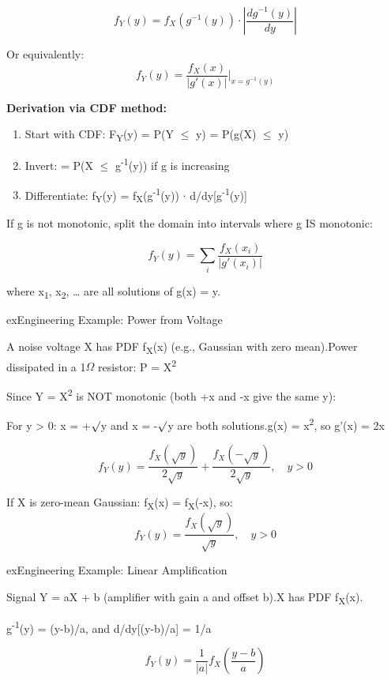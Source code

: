 \[f_Y(y) = f_X(g^{-1}(y)) \cdot \left|\frac{dg^{-1}(y)}{dy}\right|\]

Or equivalently:\PSbr{}\[f_Y(y) = \frac{f_X(x)}{|g'(x)|}\bigg|_{x=g^{-1}(y)}\]

\textbf{Derivation via CDF method:}

\begin{enumerate}
\def\labelenumi{\arabic{enumi}.}
\tightlist
\item
  Start with CDF: F\textsubscript{Y}(y) = P(Y \ensuremath{\le} y) = P(g(X) \ensuremath{\le} y)
\item
  Invert: = P(X \ensuremath{\le} g\textsuperscript{-1}(y)) if g is increasing
\item
  Differentiate: f\textsubscript{Y}(y) = f\textsubscript{X}(g\textsuperscript{-1}(y)) \ensuremath{\cdot} d/dy[g\textsuperscript{-1}(y)]
\end{enumerate}


If g is not monotonic, split the domain into intervals where g IS monotonic:

\[f_Y(y) = \sum_i \frac{f_X(x_i)}{|g'(x_i)|}\]

where x\textsubscript{1}, x\textsubscript{2}, … are all solutions of g(x) = y.

\begin{PSbox}[unbreakable]{ex}{Engineering Example: Power from Voltage}

A noise voltage X has PDF f\textsubscript{X}(x) (e.g., Gaussian with zero mean).\PSbr{}Power dissipated in a 1\ensuremath{\Omega} resistor: P = X\textsuperscript{2}

Since Y = X\textsuperscript{2} is NOT monotonic (both +x and -x give the same y):

For y \textgreater{} 0: x = +\ensuremath{\surd}y and x = -\ensuremath{\surd}y are both solutions.\PSbr{}g(x) = x\textsuperscript{2}, so g’(x) = 2x

\[f_Y(y) = \frac{f_X(\sqrt{y})}{2\sqrt{y}} + \frac{f_X(-\sqrt{y})}{2\sqrt{y}}, \quad y > 0\]

If X is zero-mean Gaussian: f\textsubscript{X}(x) = f\textsubscript{X}(-x), so:\PSbr{}\[f_Y(y) = \frac{f_X(\sqrt{y})}{\sqrt{y}}, \quad y > 0\]

\end{PSbox}

\begin{PSbox}[unbreakable]{ex}{Engineering Example: Linear Amplification}

Signal Y = aX + b (amplifier with gain a and offset b).\PSbr{}X has PDF f\textsubscript{X}(x).

g\textsuperscript{-1}(y) = (y-b)/a, and \textbar{}d/dy[(y-b)/a]\textbar{} = 1/\textbar{}a\textbar{}

\[f_Y(y) = \frac{1}{|a|} f_X\left(\frac{y-b}{a}\right)\]

\end{PSbox}

